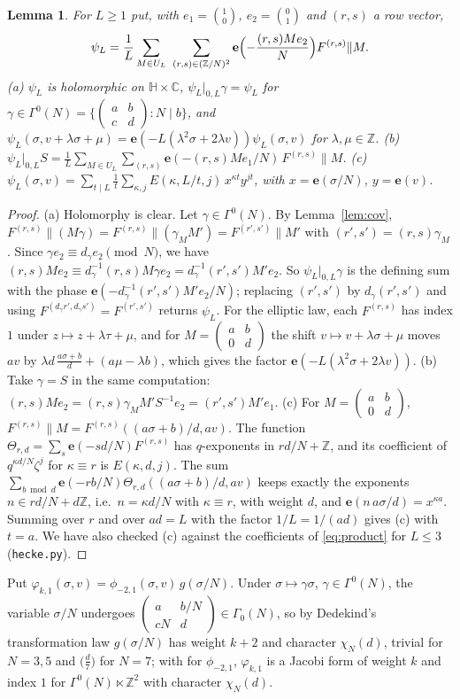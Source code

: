 \documentclass[11pt]{amsart}
\numberwithin{equation}{section}
\theoremstyle{plain}
\newtheorem{lem}[thm]{Lemma}
\theoremstyle{definition}
\theoremstyle{remark}
\newcommand{\Z}{\mathbb{Z}}
\newcommand{\C}{\mathbb{C}}
\newcommand{\e}{\mathbf{e}}
\newcommand{\pmi}{\phi_{-2,1}}
\newcommand{\sm}[4]{\left(\begin{smallmatrix}#1&#2\\#3&#4\end{smallmatrix}\right)}
\begin{document}
\begin{lem}\label{lem:hecke}
For $L\ge1$ put, with $e_1=\binom10$, $e_2=\binom01$ and $(r,s)$ a row vector,
\[
\psi_L=\frac1L\sum_{M\in U_L}\ \sum_{(r,s)\in(\Z/N)^2}\e\Bigl(-\frac{(r,s)Me_2}{N}\Bigr)F^{(r,s)}\|M .
\]
\textup{(a)} $\psi_L$ is holomorphic on $\mathbb H\times\C$, $\psi_L|_{0,L}\gamma=\psi_L$ for $\gamma\in\Gamma^0(N)=\{\sm abcd:N\mid b\}$, and $\psi_L(\sigma,v+\lambda\sigma+\mu)=\e(-L(\lambda^2\sigma+2\lambda v))\psi_L(\sigma,v)$ for $\lambda,\mu\in\Z$.
\textup{(b)} $\psi_L|_{0,L}S=\frac1L\sum_{M\in U_L}\sum_{(r,s)}\e(-(r,s)Me_1/N)\,F^{(r,s)}\|M$.
\textup{(c)} $\psi_L(\sigma,v)=\sum_{t\mid L}\frac1t\sum_{\kappa,j}E(\kappa,L/t,j)\,x^{\kappa t}y^{jt}$, with $x=\e(\sigma/N)$, $y=\e(v)$.
\end{lem}

\begin{proof}
(a) Holomorphy is clear. Let $\gamma\in\Gamma^0(N)$. By Lemma~\ref{lem:cov}, $F^{(r,s)}\|(M\gamma)=F^{(r,s)}\|(\gamma_MM')=F^{(r',s')}\|M'$ with $(r',s')=(r,s)\gamma_M$. Since $\gamma e_2\equiv d_\gamma e_2\pmod N$, we have $(r,s)Me_2\equiv d_\gamma^{-1}(r,s)M\gamma e_2=d_\gamma^{-1}(r',s')M'e_2$. So $\psi_L|_{0,L}\gamma$ is the defining sum with the phase $\e(-d_\gamma^{-1}(r',s')M'e_2/N)$; replacing $(r',s')$ by $d_\gamma(r',s')$ and using $F^{(d_\gamma r',d_\gamma s')}=F^{(r',s')}$ returns $\psi_L$. For the elliptic law, each $F^{(r,s)}$ has index $1$ under $z\mapsto z+\lambda\tau+\mu$, and for $M=\sm ab0d$ the shift $v\mapsto v+\lambda\sigma+\mu$ moves $av$ by $\lambda d\,\frac{a\sigma+b}d+(a\mu-\lambda b)$, which gives the factor $\e(-L(\lambda^2\sigma+2\lambda v))$. (b) Take $\gamma=S$ in the same computation: $(r,s)Me_2=(r,s)\gamma_MM'S^{-1}e_2=(r',s')M'e_1$. (c) For $M=\sm ab0d$, $F^{(r,s)}\|M=F^{(r,s)}((a\sigma+b)/d,av)$. The function $\Theta_{r,d}=\sum_s\e(-sd/N)F^{(r,s)}$ has $q$-exponents in $rd/N+\Z$, and its coefficient of $q^{\kappa d/N}\zeta^j$ for $\kappa\equiv r$ is $E(\kappa,d,j)$. The sum $\sum_{b\bmod d}\e(-rb/N)\Theta_{r,d}((a\sigma+b)/d,av)$ keeps exactly the exponents $n\in rd/N+d\Z$, i.e.\ $n=\kappa d/N$ with $\kappa\equiv r$, with weight $d$, and $\e(n\,a\sigma/d)=x^{\kappa a}$. Summing over $r$ and over $ad=L$ with the factor $1/L=1/(ad)$ gives (c) with $t=a$. We have also checked (c) against the coefficients of \eqref{eq:product} for $L\le3$ (\texttt{hecke.py}).
\end{proof}

Put $\varphi_{k,1}(\sigma,v)=\pmi(\sigma,v)\,g(\sigma/N)$. Under $\sigma\mapsto\gamma\sigma$, $\gamma\in\Gamma^0(N)$, the variable $\sigma/N$ undergoes $\sm a{b/N}{cN}d\in\Gamma_0(N)$, so by Dedekind's transformation law $g(\sigma/N)$ has weight $k+2$ and character $\chi_N(d)$, trivial for $N=3,5$ and $\bigl(\frac d7\bigr)$ for $N=7$; with \cite[Theorem~9.3]{EZ85} for $\pmi$, $\varphi_{k,1}$ is a Jacobi form of weight $k$ and index $1$ for $\Gamma^0(N)\ltimes\Z^2$ with character $\chi_N(d)$.
\end{document}
